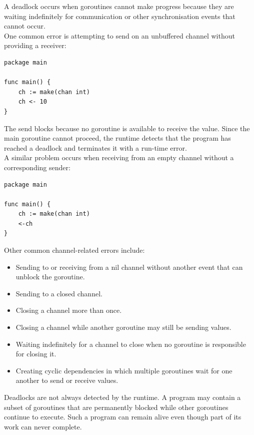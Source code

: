A deadlock occurs when goroutines cannot make progress because they are waiting indefinitely for communication or other synchronisation events that cannot occur.\\

One common error is attempting to send on an unbuffered channel without providing a receiver:

\begin{lstlisting}
package main

func main() {
    ch := make(chan int)
    ch <- 10
}
\end{lstlisting}

The send blocks because no goroutine is available to receive the value. Since the main goroutine cannot proceed, the runtime detects that the program has reached a deadlock and terminates it with a run-time error.\\

A similar problem occurs when receiving from an empty channel without a corresponding sender:

\begin{lstlisting}
package main

func main() {
    ch := make(chan int)
    <-ch
}
\end{lstlisting}

Other common channel-related errors include:\\

\begin{itemize}
    \item Sending to or receiving from a nil channel without another event that can unblock the goroutine.
    \item Sending to a closed channel.
    \item Closing a channel more than once.
    \item Closing a channel while another goroutine may still be sending values.
    \item Waiting indefinitely for a channel to close when no goroutine is responsible for closing it.
    \item Creating cyclic dependencies in which multiple goroutines wait for one another to send or receive values.
\end{itemize}

Deadlocks are not always detected by the runtime. A program may contain a subset of goroutines that are permanently blocked while other goroutines continue to execute. Such a program can remain alive even though part of its work can never complete.\\

